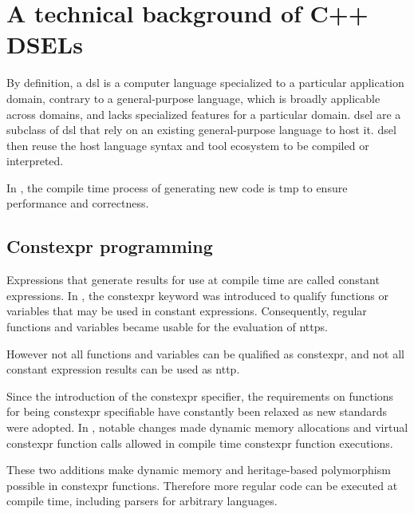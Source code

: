 \documentclass[../main]{subfiles}
\begin{document}

\section{
  A technical background of C++ DSELs
}

By definition, a \gls{dsl} is a computer language
specialized to a particular application domain, contrary to a general-purpose
language, which is broadly applicable across domains, and lacks specialized
features for a particular domain. \gls{dsel}\acrpluralsuffix{}
are a subclass of \gls{dsl} that rely on an existing general-purpose language to host
it. \gls{dsel}\acrpluralsuffix{} then reuse the host language syntax and tool ecosystem to be compiled
or interpreted.

In \cpp, the compile time process of generating new code is
\gls{tmp} to ensure performance and correctness.


\subsection{
  Constexpr programming
}
\label{lbl:constexpr-programming}

Expressions that generate results for use at compile time are called
constant expressions. In , the \gls{constexpr} keyword was introduced
to qualify functions or variables that may be used in constant expressions.
Consequently, regular functions and variables became usable for the evaluation
of \glspl{nttp}.

However not all functions and variables can be qualified as \gls{constexpr},
and not all constant expression results can be used as \gls{nttp}\acrpluralsuffix{}.

Since the introduction of the \gls{constexpr} specifier, the requirements on
functions for being \gls{constexpr} specifiable have constantly been relaxed as new
\cpp standards were adopted. In , notable changes made dynamic memory
allocations\cite{constexpr-memory} and virtual \gls{constexpr} function
calls\cite{virtual-constexpr} allowed in compile time \gls{constexpr} function
executions.

These two additions make dynamic memory and heritage-based polymorphism
possible in \gls{constexpr} functions. Therefore more regular \cpp code can be
executed at compile time, including parsers for arbitrary languages.
\end{document}
